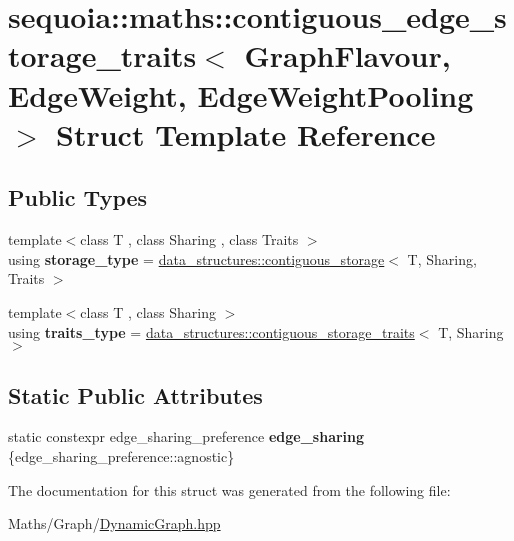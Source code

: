 \hypertarget{structsequoia_1_1maths_1_1contiguous__edge__storage__traits}{}\section{sequoia\+::maths\+::contiguous\+\_\+edge\+\_\+storage\+\_\+traits$<$ Graph\+Flavour, Edge\+Weight, Edge\+Weight\+Pooling $>$ Struct Template Reference}
\label{structsequoia_1_1maths_1_1contiguous__edge__storage__traits}
\subsection*{Public Types}
\begin{DoxyCompactItemize}
\item 
\mbox{\label{structsequoia_1_1maths_1_1contiguous__edge__storage__traits_a97e75ea9105b0db284635f4d1ea3bf44}} 
{\footnotesize template$<$class T , class Sharing , class Traits $>$ }\\using {\bfseries storage\+\_\+type} = \mbox{\hyperlink{classsequoia_1_1data__structures_1_1contiguous__storage}{data\+\_\+structures\+::contiguous\+\_\+storage}}$<$ T, Sharing, Traits $>$
\item 
\mbox{\label{structsequoia_1_1maths_1_1contiguous__edge__storage__traits_a33df22b353f49a44a57e0bc755fccf8d}} 
{\footnotesize template$<$class T , class Sharing $>$ }\\using {\bfseries traits\+\_\+type} = \mbox{\hyperlink{structsequoia_1_1data__structures_1_1contiguous__storage__traits}{data\+\_\+structures\+::contiguous\+\_\+storage\+\_\+traits}}$<$ T, Sharing $>$
\end{DoxyCompactItemize}
\subsection*{Static Public Attributes}
\begin{DoxyCompactItemize}
\item 
\mbox{\label{structsequoia_1_1maths_1_1contiguous__edge__storage__traits_a979e8f642526b5f460834e10bf3fd31d}} 
static constexpr edge\+\_\+sharing\+\_\+preference {\bfseries edge\+\_\+sharing} \{edge\+\_\+sharing\+\_\+preference\+::agnostic\}
\end{DoxyCompactItemize}


The documentation for this struct was generated from the following file\+:\begin{DoxyCompactItemize}
\item 
Maths/\+Graph/\mbox{\hyperlink{_dynamic_graph_8hpp}{Dynamic\+Graph.\+hpp}}\end{DoxyCompactItemize}
